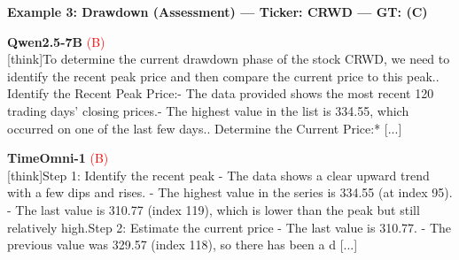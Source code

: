 \vspace{8pt}


\noindent
\textbf{Example 3: Drawdown (Assessment) --- Ticker: CRWD --- GT: (C)}
\vspace{2pt}

\noindent
\begin{minipage}[t]{0.28\textwidth}
\colorbox{red!8}{\parbox{\dimexpr\textwidth-2\fboxsep}{
\textbf{Qwen2.5-7B} \textcolor{red}{(B)} \\[2pt]
\tiny
[think]\newline To determine the current drawdown phase of the stock CRWD, we need to identify the recent peak price and then compare the current price to this peak.. Identify the Recent Peak Price:\newline    - The data provided shows the most recent 120 trading days' closing prices.\newline    - The highest value in the list is 334.55, which occurred on one of the last few days.. Determine the Current Price:* [...]
}}
\end{minipage}
\hfill
\begin{minipage}[t]{0.28\textwidth}
\colorbox{red!8}{\parbox{\dimexpr\textwidth-2\fboxsep}{
\textbf{TimeOmni-1} \textcolor{red}{(B)} \\[2pt]
\tiny
[think]\newline Step 1: Identify the recent peak  \newline - The data shows a clear upward trend with a few dips and rises.  \newline - The highest value in the series is 334.55 (at index 95).  \newline - The last value is 310.77 (index 119), which is lower than the peak but still relatively high.\newline Step 2: Estimate the current price  \newline - The last value is 310.77.  \newline - The previous value was 329.57 (index 118), so there has been a d [...]
}}
\end{minipage}
\hfill
